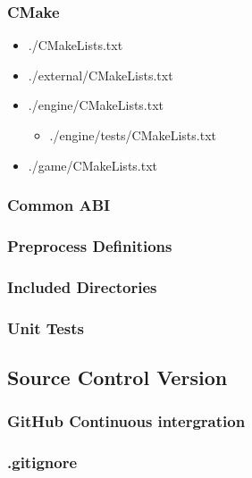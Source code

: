 \newpage
\subsubsection{CMake}
\begin{itemize}
    \item ./CMakeLists.txt
    \item ./external/CMakeLists.txt
    \item ./engine/CMakeLists.txt
        \begin{itemize}
            \item ./engine/tests/CMakeLists.txt
        \end{itemize}
    \item ./game/CMakeLists.txt
\end{itemize}

\newpage

\label{sec:abi}
\subsubsection{Common ABI}

\subsubsection{Preprocess Definitions}

\subsubsection{Included Directories}

\subsubsection{Unit Tests}
\label{sec:build_unit_tests}

\subsection{Source Control Version}
\subsubsection{GitHub Continuous intergration}
\subsubsection{.gitignore}